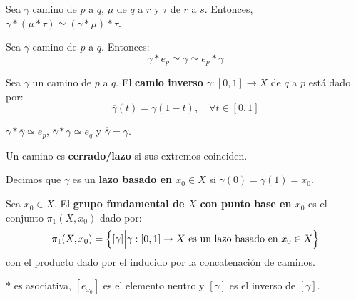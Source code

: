 \documentclass[12pt]{report}
\theoremstyle{largebreak}
\newcommand\cf[3]{\ensuremath{#1:#2\rightarrow#3}}
\begin{document}
    \begin{lema}
        Sea $\gamma$ camino de $p$ a $q$, $\mu$ de $q$ a $r$ y $\tau$ de $r$ a $s$. Entonces, $\gamma*(\mu*\tau)\simeq(\gamma*\mu)*\tau$.
    \end{lema}

    \begin{lema}
        Sea $\gamma$ camino de $p$ a $q$. Entonces:
        \begin{equation*}
            \gamma*e_p\simeq\gamma\simeq e_p*\gamma
        \end{equation*}
    \end{lema}

    \begin{mydef}
        Sea $\gamma$ un camino de $p$ a $q$. El \textbf{camio inverso} $\cf{\overline{\gamma}}{[0,1]}{X}$ de $q$ a $p$ está dado por:
        \begin{equation*}
            \overline{\gamma}(t)=\gamma(1-t),\quad\forall t\in[0,1]
        \end{equation*}
    \end{mydef}

    \begin{lema}
        $\gamma*\overline{\gamma}\simeq e_p$, $\overline{\gamma}*\gamma\simeq e_q$ y $\overline{\overline{\gamma}}=\gamma$.
    \end{lema}

    \begin{mydef}
        Un camino es \textbf{cerrado/lazo} si sus extremos coinciden.
    \end{mydef}

    \begin{mydef}
        Decimos que $\gamma$ es un \textbf{lazo basado en $x_0\in X$} si $\gamma(0)=\gamma(1)=x_0$.
    \end{mydef}

    \begin{mydef}
        Sea $x_0\in X$. El \textbf{grupo fundamental de $X$ con punto base en $x_0$} es el conjunto $\pi_1(X,x_0)$ dado por:
        \begin{equation*}
            \pi_1(X,x_0)=\left\{[\gamma]\Big|\cf{\gamma}{[0,1]}{X}\textup{ es un lazo basado en }x_0\in X \right\}
        \end{equation*}
        con el producto dado por el inducido por la concatenación de caminos.
    \end{mydef}

    \begin{obs}
        $*$ es asociativa, $[e_{ x_0}]$ es el elemento neutro y $[\overline{\gamma}]$ es el inverso de $[\gamma]$.
    \end{obs}
\end{document}
